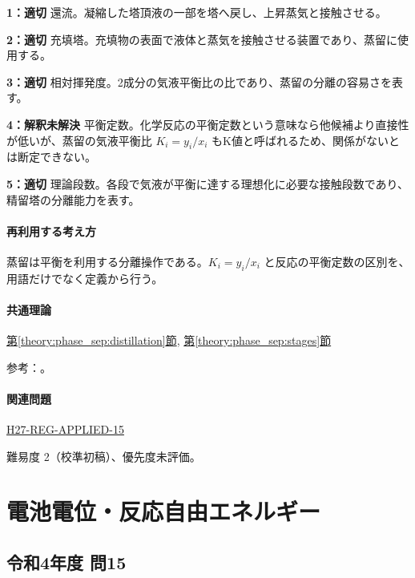 \noindent\textbf{1：適切} 還流。凝縮した塔頂液の一部を塔へ戻し、上昇蒸気と接触させる。\par

\noindent\textbf{2：適切} 充填塔。充填物の表面で液体と蒸気を接触させる装置であり、蒸留に使用する。\par

\noindent\textbf{3：適切} 相対揮発度。2成分の気液平衡比の比であり、蒸留の分離の容易さを表す。\par

\noindent\textbf{4：解釈未解決} 平衡定数。化学反応の平衡定数という意味なら他候補より直接性が低いが、蒸留の気液平衡比 \(K_i=y_i/x_i\) もK値と呼ばれるため、関係がないとは断定できない。\par

\noindent\textbf{5：適切} 理論段数。各段で気液が平衡に達する理想化に必要な接触段数であり、精留塔の分離能力を表す。\par

\paragraph{再利用する考え方} 蒸留は平衡を利用する分離操作である。\(K_i=y_i/x_i\) と反応の平衡定数の区別を、用語だけでなく定義から行う。

\paragraph{共通理論} \hyperref[theory:phase_sep:distillation]{第\ref*{theory:phase_sep:distillation}節}, \hyperref[theory:phase_sep:stages]{第\ref*{theory:phase_sep:stages}節}

\par 参考：\cite{nptel_distillation1}。

\paragraph{関連問題} \hyperref[q:h27-reg-applied-15]{H27-REG-APPLIED-15}

\par 難易度 2（校準初稿）、優先度未評価。

\section{電池電位・反応自由エネルギー}

\subsection{令和4年度 問15}
\label{q:r04-reg-applied-15}


